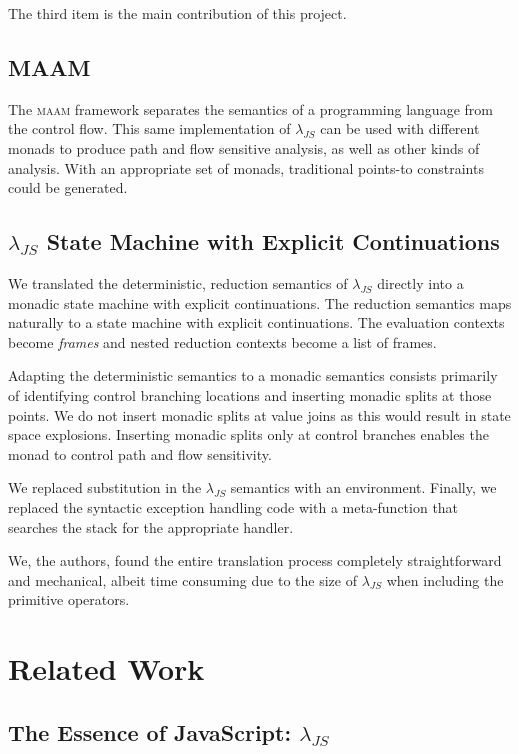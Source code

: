 \documentclass[10pt,letter,english]{article}
\newcommand{\maam}[0]{\textsc{maam}}
\newcommand{\lambdajs}[0]{$\lambda_{JS}$}
\begin{document}
The third item is the main contribution of this project.

\subsection{MAAM}

The \maam{} framework separates the semantics of a programming language from the
control flow. This same implementation of \lambdajs{} can be used with different
monads to produce path and flow sensitive analysis, as well as other kinds of
analysis. With an appropriate set of monads, traditional points-to constraints
could be generated.

\subsection{\lambdajs{} State Machine with Explicit Continuations}

We translated the deterministic, reduction semantics of \lambdajs{} directly
into a monadic state machine with explicit continuations. The reduction
semantics maps naturally to a state machine with explicit continuations. The
evaluation contexts become \emph{frames} and nested reduction contexts become a
list of frames.

Adapting the deterministic semantics to a monadic semantics consists primarily
of identifying control branching locations and inserting monadic splits at those
points. We do not insert monadic splits at value joins as this would result in
state space explosions. Inserting monadic splits only at control branches
enables the monad to control path and flow sensitivity.

We replaced substitution in the \lambdajs{} semantics with an
environment. Finally, we replaced the syntactic exception handling code with a
meta-function that searches the stack for the appropriate handler.

We, the authors, found the entire translation process completely straightforward
and mechanical, albeit time consuming due to the size of \lambdajs{} when
including the primitive operators.

\section{Related Work}
\subsection{The Essence of JavaScript: \lambdajs{}}
\end{document}
